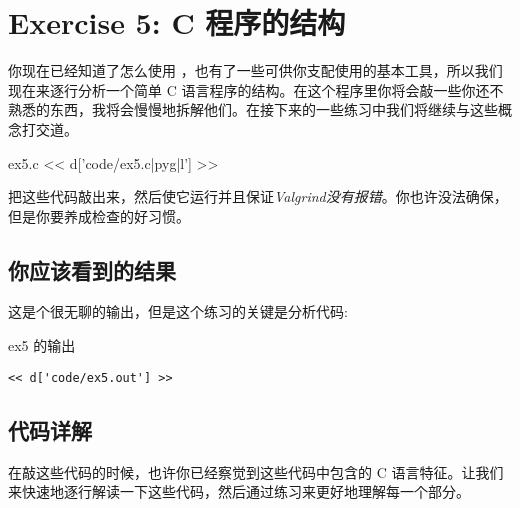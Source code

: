\chapter{Exercise 5: C 程序的结构}

你现在已经知道了怎么使用  ，也有了一些可供你支配使用的基本工具，所以我们现在来逐行分析一个简单 C 语言程序的结构。在这个程序里你将会敲一些你还不熟悉的东西，我将会慢慢地拆解他们。在接下来的一些练习中我们将继续与这些概念打交道。

\begin{code}{ex5.c}
<< d['code/ex5.c|pyg|l'] >>
\end{code}

把这些代码敲出来，然后使它运行并且保证\emph{Valgrind没有报错}。你也许没法确保，但是你要养成检查的好习惯。

\section{你应该看到的结果}

这是个很无聊的输出，但是这个练习的关键是分析代码:

\begin{code}{ex5 的输出}
\begin{lstlisting}
<< d['code/ex5.out'] >>
\end{lstlisting}
\end{code}

\section{代码详解}

在敲这些代码的时候，也许你已经察觉到这些代码中包含的 C 语言特征。让我们来快速地逐行解读一下这些代码，然后通过练习来更好地理解每一个部分。

